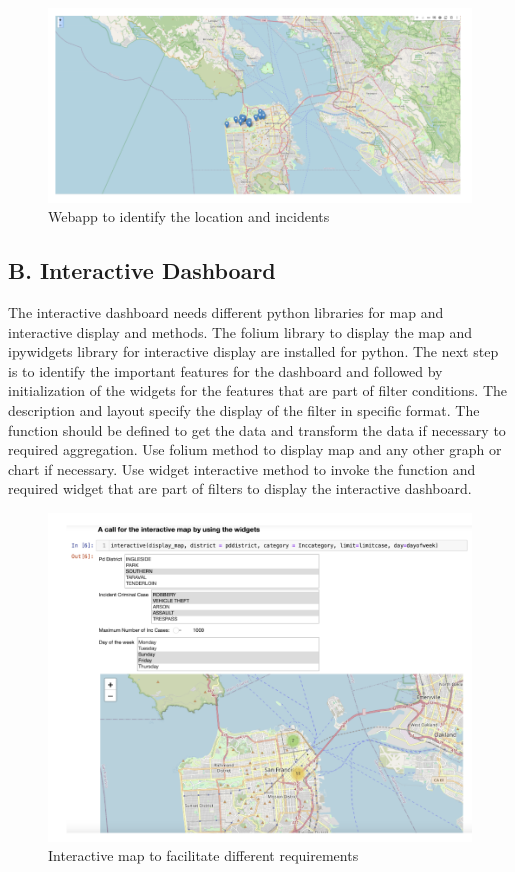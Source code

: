 \documentclass[11 pt,conference,final,]{IEEEtran}
\begin{document}
\begin{figure}

{\centering \includegraphics[width=0.65\linewidth]{img/fig14a} 

}

\caption{Webapp to identify the location and incidents}\label{fig:unnamed-chunk-17}
\end{figure}

\subsection{B. Interactive Dashboard}\label{b.-interactive-dashboard}

The interactive dashboard needs different python libraries for map and
interactive display and methods. The folium library to display the map
and ipywidgets library for interactive display are installed for python.
The next step is to identify the important features for the dashboard
and followed by initialization of the widgets for the features that are
part of filter conditions. The description and layout specify the
display of the filter in specific format. The function should be defined
to get the data and transform the data if necessary to required
aggregation. Use folium method to display map and any other graph or
chart if necessary. Use widget interactive method to invoke the function
and required widget that are part of filters to display the interactive
dashboard.

\begin{figure}

{\centering \includegraphics[width=0.65\linewidth]{img/fig14b} 

}

\caption{Interactive map to facilitate different requirements}\label{fig:unnamed-chunk-18}
\end{figure}
\end{document}
